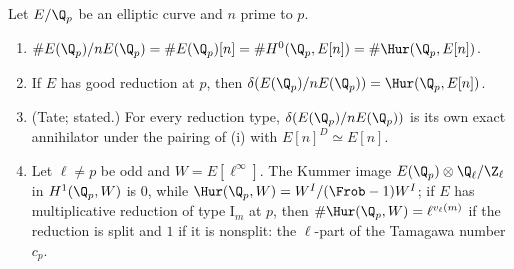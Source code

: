 \begin{proposition}\label{prop:galcoh:ec-local-image}
Let $E/\Q_p$ be an elliptic curve and $n$ prime to $p$.
\begin{enumerate}[label=(\roman*)]
\item $\#E(\Q_p)/nE(\Q_p)=\#E(\Q_p)[n]=\#H^0(\Q_p,E[n])=\#\Hur(\Q_p,E[n])$.
\item If $E$ has good reduction at $p$, then $\delta(E(\Q_p)/nE(\Q_p))=\Hur(\Q_p,E[n])$.
\item (Tate; stated.) For every reduction type, $\delta(E(\Q_p)/nE(\Q_p))$ is its own exact annihilator under the pairing of (i) with
$E[n]^D\simeq E[n]$.
\item Let $\ell\ne p$ be odd and $W=E[\ell^\infty]$. The Kummer image $E(\Q_p)\otimes\Q_\ell/\Z_\ell$ in $H^1(\Q_p,W)$ is $0$, while $\Hur(\Q_p,W)=W^I/(\Frob-1)W^I$; if $E$ has
multiplicative reduction of type $\mathrm I_m$ at $p$, then $\#\Hur(\Q_p,W)=\ell^{v_\ell(m)}$ if the reduction is split and $1$ if it is nonsplit: the $\ell$-part of the
Tamagawa number $c_p$.
\end{enumerate}
\end{proposition}

